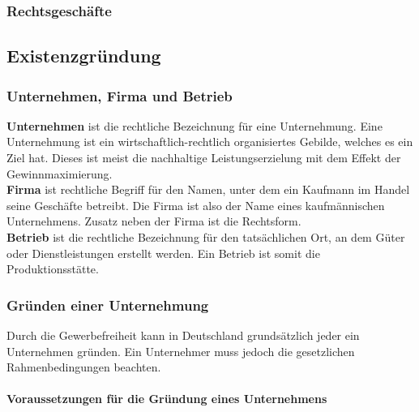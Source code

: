 \subsubsection{Rechtsgeschäfte}



\subsection{Existenzgründung}

\subsubsection{Unternehmen, Firma und Betrieb}

{\bf Unternehmen} ist die rechtliche Bezeichnung für eine Unternehmung. Eine 	Unternehmung ist ein wirtschaftlich-rechtlich organisiertes Gebilde, welches es ein Ziel hat. Dieses ist meist die nachhaltige Leistungserzielung mit dem Effekt der Gewinnmaximierung.\\

{\bf Firma} ist rechtliche Begriff für den Namen, unter dem ein Kaufmann im Handel seine Geschäfte betreibt. Die Firma ist also der Name eines kaufmännischen Unternehmens. Zusatz neben der Firma ist die Rechtsform.\\

{\bf Betrieb} ist die rechtliche Bezeichnung für den tatsächlichen Ort, an dem Güter oder Dienstleistungen erstellt werden. Ein Betrieb ist somit die Produktionsstätte.

\subsubsection{Gründen einer Unternehmung}
Durch die Gewerbefreiheit kann in Deutschland grundsätzlich jeder ein Unternehmen gründen. Ein Unternehmer muss jedoch die gesetzlichen Rahmenbedingungen beachten.

\paragraph{Voraussetzungen für die Gründung eines Unternehmens} ~\\

